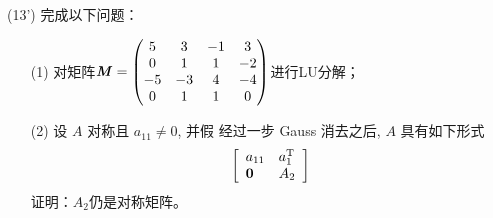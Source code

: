 \documentclass[12pt,a4paper,openany,twoside]{ctexbook}
\begin{document}
\begin{exercise}(13')
	完成以下问题：
	
	\begin{itemize}
		\item [(1)]  对矩阵$\boldsymbol{\mathit{M}} = \begin{pmatrix}
			5& 3& -1&  3\\
			0& 1&  1& -2\\
			-5& -3&  4& -4\\
			0&  1&  1&  0\\
		\end{pmatrix}$进行LU分解；
		\item [(2)] 设 $A$ 对称且 $a_{11} \neq 0$, 并假 经过一步 Gauss 消去之后, $A$ 具有如下形式
		$$
		\left[\begin{array}{ll}
			a_{11} & a_1^{\mathrm{T}} \\
			\boldsymbol{0} & A_2
		\end{array}\right]
		$$
		证明：$A_2$仍是对称矩阵。
	\end{itemize}
	
\end{exercise}
%	
\end{document}
